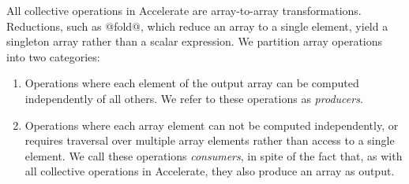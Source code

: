 All collective operations in Accelerate are array-to-array transformations.
Reductions, such as @fold@, which reduce an array to a single element,
yield a singleton array rather than a scalar expression. We partition array
operations into two categories:

\begin{enumerate}
    \item Operations where each element of the output array can be computed
        independently of all others. We refer to these operations as
        \emph{producers}.

    \item Operations where each array element can not be computed independently,
        or requires traversal over multiple array elements rather than access to
        a single element. We call these operations
        \emph{consumers}, in spite of the fact that, as with all
        collective operations in Accelerate, they also produce an array as
        output.

\end{enumerate}

